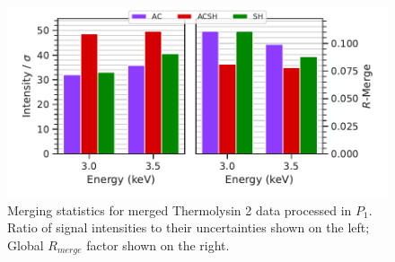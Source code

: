 \begin{figure}[]
    \centering
    \includegraphics{plots/exp1/tlys_2_P1/stats.pdf}
    \caption{Merging statistics for merged Thermolysin 2 data processed in $P_1$. Ratio of signal intensities to their uncertainties shown on the left; Global $R_{merge}$ factor shown on the right.}
    \label{fig:tlys_2_p1}
\end{figure}

